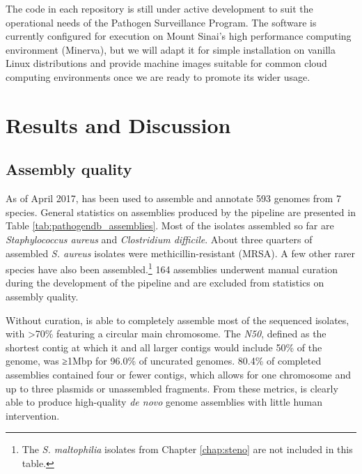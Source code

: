 The code in each repository is still under active development to suit the operational needs of the Pathogen Surveillance Program. The software is currently configured for execution on Mount Sinai's high performance computing environment (Minerva), but we will adapt it for simple installation on vanilla Linux distributions and provide machine images suitable for common cloud computing environments once we are ready to promote its wider usage.

\section{Results and Discussion}

\subsection{Assembly quality}

As of April 2017, \pathogendbpipeline{} has been used to assemble and annotate 593 genomes from 7 species. General statistics on assemblies produced by the pipeline are presented in Table \ref{tab:pathogendb_assemblies}. Most of the isolates assembled so far are \emph{Staphylococcus aureus} and \emph{Clostridium difficile}. About three quarters of assembled \emph{S. aureus} isolates were methicillin-resistant (MRSA). A few other rarer species have also been assembled.\footnote{The \emph{S. maltophilia} isolates from Chapter \ref{chap:steno} are not included in this table.} 164 assemblies underwent manual curation during the development of the pipeline and are excluded from statistics on assembly quality.

\begin{table}[htb]
  
  \caption[Statistics on assemblies generated by \pathogendbpipeline{} since 2013]{\textbf{Statistics on assemblies generated by \pathogendbpipeline{} since 2013.} $^a$Any contig ≥1Mbp that circularized was considered a chromosome. Abbreviations: N50, shortest contig length above which 50\% of the genome is included; Mbp, 1 million base pairs; kbp, 1 thousand base pairs.
}
  \label{tab:pathogendb_assemblies}
\end{table}

Without curation, \pathogendbpipeline{} is able to completely assemble most of the sequenced isolates, with >70\% featuring a circular main chromosome. The \emph{N50}, defined as the shortest contig at which it and all larger contigs would include 50\% of the genome, was ≥1Mbp for 96.0\% of uncurated genomes. 80.4\% of completed assemblies contained four or fewer contigs, which allows for one chromosome and up to three plasmids or unassembled fragments. From these metrics, \pathogendbpipeline{} is clearly able to produce high-quality \emph{de novo} genome assemblies with little human intervention.

